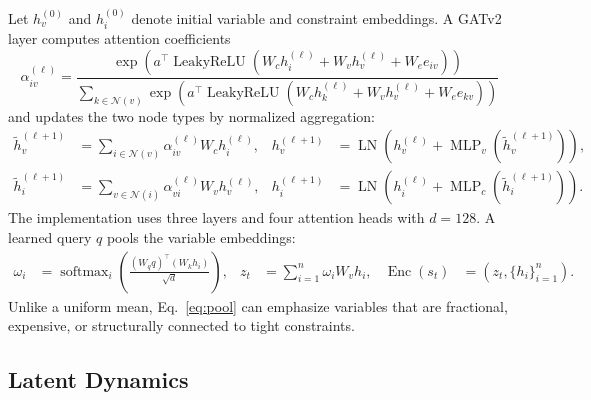 \documentclass{article}
\newcommand{\softmax}{\operatorname{softmax}}
\begin{document}
Let $h_v^{(0)}$ and $h_i^{(0)}$ denote initial variable and constraint embeddings. A GATv2 layer computes attention coefficients
\begin{equation}
  \alpha_{iv}^{(\ell)}
  =
  \frac{\exp\left(
    a^\top \operatorname{LeakyReLU}
    \left(W_c h_i^{(\ell)}+W_v h_v^{(\ell)}
          +W_e e_{iv}\right)\right)}
  {\sum_{k\in\mathcal{N}(v)}
    \exp\left(
    a^\top \operatorname{LeakyReLU}
    \left(W_c h_k^{(\ell)}+W_v h_v^{(\ell)}
          +W_e e_{kv}\right)\right)}
  \label{eq:attention}
\end{equation}
and updates the two node types by normalized aggregation:
\begin{align}
  \widetilde h_v^{(\ell+1)}
    &=\sum_{i\in\mathcal{N}(v)}
       \alpha_{iv}^{(\ell)}W_c h_i^{(\ell)}, &
  h_v^{(\ell+1)}
    &=\operatorname{LN}\!\left(
      h_v^{(\ell)}+\operatorname{MLP}_v(\widetilde h_v^{(\ell+1)})
      \right), \\
  \widetilde h_i^{(\ell+1)}
    &=\sum_{v\in\mathcal{N}(i)}
       \alpha_{vi}^{(\ell)}W_v h_v^{(\ell)}, &
  h_i^{(\ell+1)}
    &=\operatorname{LN}\!\left(
      h_i^{(\ell)}+\operatorname{MLP}_c(\widetilde h_i^{(\ell+1)})
      \right).
  \label{eq:gnn-update}
\end{align}
The implementation uses three layers and four attention heads with $d=128$. A learned query $q$ pools the variable embeddings:
\begin{align}
  \omega_i&=
  \softmax_i\!\left(\frac{(W_q q)^\top(W_k h_i)}{\sqrt d}\right), &
  z_t&=\sum_{i=1}^{n}\omega_i W_v h_i, &
  \operatorname{Enc}(s_t)&=(z_t,\{h_i\}_{i=1}^{n}).
  \label{eq:pool}
\end{align}
Unlike a uniform mean, Eq.~\eqref{eq:pool} can emphasize variables that are fractional, expensive, or structurally connected to tight constraints.

\subsection{Latent Dynamics}
\end{document}
